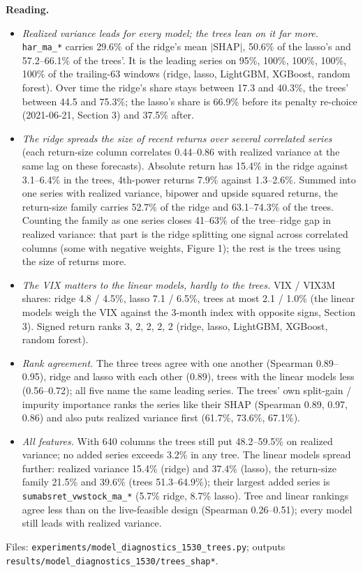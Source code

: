 \documentclass[10pt]{article}
\begin{document}
\textbf{Reading.}
\begin{itemize}\itemsep1pt
\item \emph{Realized variance leads for every model; the trees lean on it far more.} \texttt{har\_ma\_*} carries 29.6\% of the ridge's mean $|$SHAP$|$, 50.6\% of the lasso's and 57.2--66.1\% of the trees'. It is the leading series on 95\%, 100\%, 100\%, 100\%, 100\% of the trailing-63 windows (ridge, lasso, LightGBM, XGBoost, random forest). Over time the ridge's share stays between 17.3 and 40.3\%, the trees' between 44.5 and 75.3\%; the lasso's share is 66.9\% before its penalty re-choice (2021-06-21, Section 3) and 37.5\% after.
\item \emph{The ridge spreads the size of recent returns over several correlated series} (each return-size column correlates 0.44--0.86 with realized variance at the same lag on these forecasts). Absolute return has 15.4\% in the ridge against 3.1--6.4\% in the trees, 4th-power returns 7.9\% against 1.3--2.6\%. Summed into one series with realized variance, bipower and upside squared returns, the return-size family carries 52.7\% of the ridge and 63.1--74.3\% of the trees. Counting the family as one series closes 41--63\% of the tree--ridge gap in realized variance: that part is the ridge splitting one signal across correlated columns (some with negative weights, Figure 1); the rest is the trees using the size of returns more.
\item \emph{The VIX matters to the linear models, hardly to the trees.} VIX / VIX3M shares: ridge 4.8 / 4.5\%, lasso 7.1 / 6.5\%, trees at most 2.1 / 1.0\% (the linear models weigh the VIX against the 3-month index with opposite signs, Section 3). Signed return ranks 3, 2, 2, 2, 2 (ridge, lasso, LightGBM, XGBoost, random forest).
\item \emph{Rank agreement.} The three trees agree with one another (Spearman 0.89--0.95), ridge and lasso with each other (0.89), trees with the linear models less (0.56--0.72); all five name the same leading series. The trees' own split-gain / impurity importance ranks the series like their SHAP (Spearman 0.89, 0.97, 0.86) and also puts realized variance first (61.7\%, 73.6\%, 67.1\%).
\item \emph{All features.} With 640 columns the trees still put 48.2--59.5\% on realized variance; no added series exceeds 3.2\% in any tree. The linear models spread further: realized variance 15.4\% (ridge) and 37.4\% (lasso), the return-size family 21.5\% and 39.6\% (trees 51.3--64.9\%); their largest added series is \texttt{sumabsret\_vwstock\_ma\_*} (5.7\% ridge, 8.7\% lasso). Tree and linear rankings agree less than on the live-feasible design (Spearman 0.26--0.51); every model still leads with realized variance.
\end{itemize}
Files: \texttt{experiments/model\_diagnostics\_1530\_trees.py}; outputs \texttt{results/model\_diagnostics\_1530/trees\_shap*}.
\end{document}
